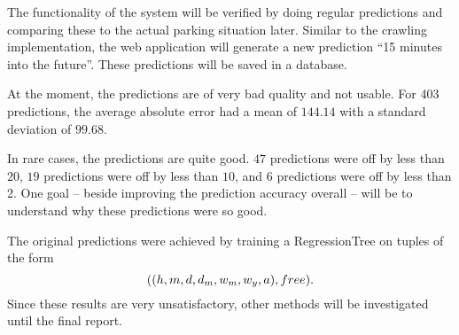 
The functionality of the system will be verified by doing regular predictions and comparing these to the actual 
parking situation later. Similar to the crawling implementation, the web application will generate a new prediction 
``15 minutes into the future''. These predictions will be saved in a database. 


At the moment, the predictions are of very bad quality and not usable. For 403 predictions, the average absolute error had a mean of \(144.14\) with a standard deviation of \(99.68\).

In rare cases, the predictions are quite good. \(47\) predictions were off by less than \(20\), 
\(19\) predictions were off by less than \(10\), and \(6\) predictions were off by less than 2. One goal -- beside improving the prediction accuracy overall -- will be to understand why these predictions were so good.

The original predictions were achieved by training a RegressionTree on tuples of the form 
\[
((h, m, d, d_m, w_m, w_y, a), free)\text{.}
\]
Since these results are very unsatisfactory, other methods will be investigated until the final report.
